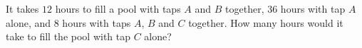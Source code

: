 It takes $12$ hours to fill a pool with taps $A$ and $B$ together, $36$ hours with tap $A$ alone, and $8$ hours with taps $A$, $B$ and $C$ together. How many hours would it take to fill the pool with tap $C$ alone?
